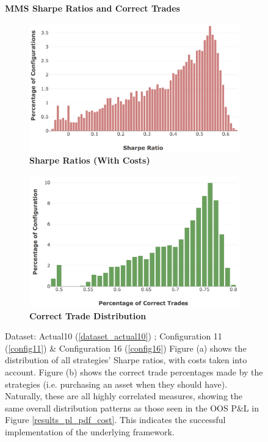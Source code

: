 \documentclass[a4paper,11pt,oneside]{article}
\theoremstyle{plain}
\theoremstyle{definition}
\begin{document}
	
	\begin{figure}[H]
		\centering
		\textbf{MMS Sharpe Ratios and Correct Trades}
		\begin{subfigure}{.49\textwidth}
			\centering 
			\includegraphics[scale=0.24]{images/results/8_8_mms/sharpe_ratios.png} 
			\caption{\textbf{Sharpe Ratios (With Costs)}}
			\label{figure-sharpe_ratios}
		\end{subfigure}%
		\begin{subfigure}{.49\textwidth}
			\includegraphics[scale=0.23]{images/results/8_8_mms/confusion_dist.png} 
			\caption{\textbf{Correct Trade Distribution}}
			\label{figure-confusion_dist}
		\end{subfigure}
		\caption[MMS Sharpe Ratios and Correct Trades]{Dataset: Actual10 (\ref{dataset_actual10}) ; Configuration 11 (\ref{config11}) \&  Configuration 16 (\ref{config16})
			\newline Figure (a) shows the distribution of all strategies' Sharpe ratios, with costs taken into account. Figure (b) shows the correct trade percentages made by the strategies (i.e. purchasing an asset when they should have). Naturally, these are all highly correlated measures, showing the same overall distribution patterns as those seen in the OOS P\&L in Figure \ref{results_pl_pdf_cost}. This indicates the successful implementation of the underlying framework.
		}
		\label{results_mms_sr_conf}
	\end{figure}
\end{document}
